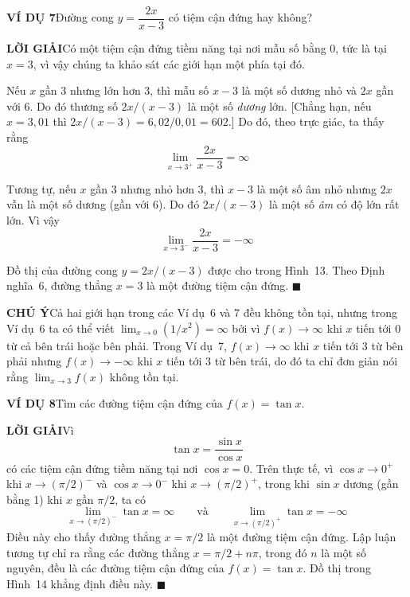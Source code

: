 \begin{minipage}[t]{0.69\textwidth}
    \textbf{\textsf{\color{stewartcyan}VÍ DỤ 7}}\quad Đường cong $y = \dfrac{2x}{x - 3}$ có tiệm cận đứng hay không?
    \par\vspace{6pt}
    \textbf{\textsf{\color{stewartcyan}LỜI GIẢI}}\quad Có một tiệm cận đứng tiềm năng tại nơi mẫu số bằng 0, tức là tại $x = 3$, vì vậy chúng ta khảo sát các giới hạn một phía tại đó.

    \vspace{4pt}
    Nếu $x$ gần 3 nhưng lớn hơn 3, thì mẫu số $x - 3$ là một số dương nhỏ và $2x$ gần với 6. Do đó thương số $2x/(x - 3)$ là một số \emph{dương} lớn. [Chẳng hạn, nếu $x = 3{,}01$ thì $2x/(x - 3) = 6{,}02/0{,}01 = 602$.] Do đó, theo trực giác, ta thấy rằng
    \[
    \lim_{x \to 3^+} \frac{2x}{x - 3} = \infty
    \]

    Tương tự, nếu $x$ gần 3 nhưng nhỏ hơn 3, thì $x - 3$ là một số âm nhỏ nhưng $2x$ vẫn là một số dương (gần với 6). Do đó $2x/(x - 3)$ là một số \emph{âm} có độ lớn rất lớn. Vì vậy
    \[
    \lim_{x \to 3^-} \frac{2x}{x - 3} = -\infty
    \]

    Đồ thị của đường cong $y = 2x/(x - 3)$ được cho trong Hình~13. Theo Định nghĩa~6, đường thẳng $x = 3$ là một đường tiệm cận đứng.
    \hfill{\color{stewartcyan}$\blacksquare$}

    \vspace{10pt}
    \textbf{\textsf{\color{stewartgreen}CHÚ Ý}}\quad Cả hai giới hạn trong các Ví dụ~6 và 7 đều không tồn tại, nhưng trong Ví dụ~6 ta có thể viết $\lim_{x \to 0} (1/x^2) = \infty$ bởi vì $f(x) \to \infty$ khi $x$ tiến tới 0 từ cả bên trái hoặc bên phải. Trong Ví dụ~7, $f(x) \to \infty$ khi $x$ tiến tới 3 từ bên phải nhưng $f(x) \to -\infty$ khi $x$ tiến tới 3 từ bên trái, do đó ta chỉ đơn giản nói rằng $\lim_{x \to 3} f(x)$ không tồn tại.

    \vspace{10pt}
    \textbf{\textsf{\color{stewartcyan}VÍ DỤ 8}}\quad Tìm các đường tiệm cận đứng của $f(x) = \tan x$.
    \par\vspace{6pt}
    \textbf{\textsf{\color{stewartcyan}LỜI GIẢI}}\quad Vì
    \[
    \tan x = \frac{\sin x}{\cos x}
    \]
    có các tiệm cận đứng tiềm năng tại nơi $\cos x = 0$. Trên thực tế, vì $\cos x \to 0^+$ khi $x \to (\pi/2)^-$ và $\cos x \to 0^-$ khi $x \to (\pi/2)^+$, trong khi $\sin x$ dương (gần bằng 1) khi $x$ gần $\pi/2$, ta có
    \[
    \lim_{x \to (\pi/2)^-} \tan x = \infty \qquad \text{và} \qquad \lim_{x \to (\pi/2)^+} \tan x = -\infty
    \]
    Điều này cho thấy đường thẳng $x = \pi/2$ là một đường tiệm cận đứng. Lập luận tương tự chỉ ra rằng các đường thẳng $x = \pi/2 + n\pi$, trong đó $n$ là một số nguyên, đều là các đường tiệm cận đứng của $f(x) = \tan x$. Đồ thị trong Hình~14 khẳng định điều này.
    \hfill{\color{stewartcyan}$\blacksquare$}


\end{minipage}

